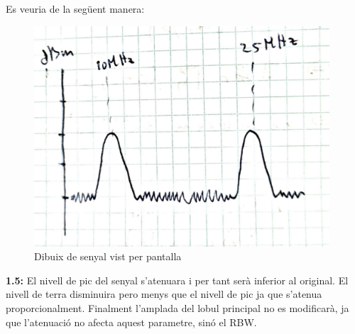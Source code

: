 \documentclass[12pt, a4papre]{article}
\begin{document}
	Es veuria de la següent manera:
	\begin{figure}[H]
		\begin{center}
		\includegraphics[width=110mm]{Previ_2.png}
		\caption{Dibuix de senyal vist per pantalla}
		\end{center}
	\end{figure}
	
	\textbf{1.5:} El nivell de pic del senyal s'atenuara i per tant serà inferior al original. El nivell de terra disminuira pero menys que el nivell de pic ja que s'atenua proporcionalment. Finalment l'amplada del lobul principal no es modificarà, ja que l'atenuació no afecta aquest parametre, sinó el RBW.
	
	
\end{document}
